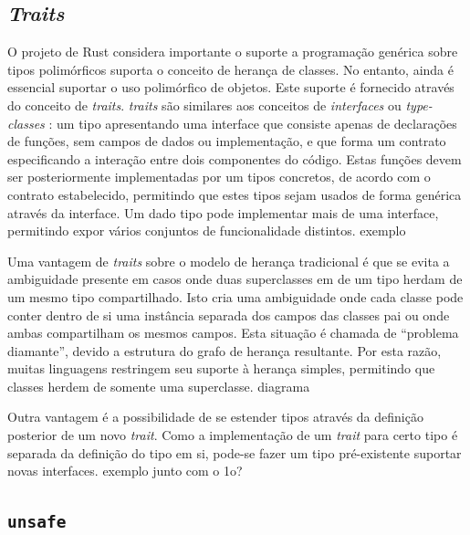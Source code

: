\documentclass[tg]{mdtufsm}
\newcommand{\todo}[1]{\textsf{\color{red}#1}}
\begin{document}
\subsection{\emph{Traits}}

O projeto de Rust considera importante o suporte a programação genérica sobre tipos polimórficos suporta o conceito de herança de classes. No entanto, ainda é essencial suportar o uso polimórfico de objetos. Este suporte é fornecido através do conceito de \emph{traits}. \emph{traits} são similares aos conceitos de \emph{interfaces} ou \emph{type-classes} \citep{wadler1989}: um tipo apresentando uma interface que consiste apenas de declarações de funções, sem campos de dados ou implementação, e que forma um contrato especificando a interação entre dois componentes do código. Estas funções devem ser posteriormente implementadas por um tipos concretos, de acordo com o contrato estabelecido, permitindo que estes tipos sejam usados de forma genérica através da interface. Um dado tipo pode implementar mais de uma interface, permitindo expor vários conjuntos de funcionalidade distintos. \citep{rust-guide} \todo {exemplo}

Uma vantagem de \emph{traits} sobre o modelo de herança tradicional é que se evita a ambiguidade presente em casos onde duas superclasses em de um tipo herdam de um mesmo tipo compartilhado. Isto cria uma ambiguidade onde cada classe pode conter dentro de si uma instância separada dos campos das classes pai ou onde ambas compartilham os mesmos campos. Esta situação é chamada de ``problema diamante'', devido a estrutura do grafo de herança resultante. Por esta razão, muitas linguagens restringem seu suporte à herança simples, permitindo que classes herdem de somente uma superclasse. \citep{scharli2003} \todo{diagrama}

Outra vantagem é a possibilidade de se estender tipos através da definição posterior de um novo \emph{trait}. Como a implementação de um \emph{trait} para certo tipo é separada da definição do tipo em si, pode-se fazer um tipo pré-existente suportar novas interfaces. \todo{exemplo junto com o 1o?}

\subsection{\texttt{unsafe}}
\end{document}
